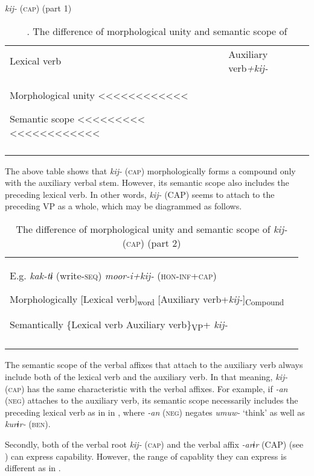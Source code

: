 \begin{table}
\caption{\label{tab:key:89}. The difference of morphological unity and semantic scope of} \textmd{\textit{kij-}}\textmd{ (\textsc{cap}) (part 1)}
\begin{tabular}{ll}
\lsptoprule
  Lexical verb  & Auxiliary verb\textit{+kij-}\\

Morphological unity    <<<<<<<<<<<<

Semantic scope  <<<<<<<<<  <<<<<<<<<<<<\\
\lspbottomrule
\end{tabular}
\end{table}

The above table shows that \textit{kij-} (\textsc{cap}) morphologically forms a compound only with the auxiliary verbal stem. However, its semantic scope also includes the preceding lexical verb. In other words, \textit{kij-} (CAP) seems to attach to the preceding VP as a whole, which may be diagrammed as follows.

\begin{table}
\caption{\label{tab:key:90} The difference of morphological unity and semantic scope of \textit{kij-} (\textsc{cap}) (part 2)}
\begin{tabular}{ll}
\lsptoprule
E.g.  \textit{kak-tɨ} (write-\textsc{seq})  \textit{moor-i+kij-} (\textsc{hon}-\textsc{inf}+\textsc{cap})

Morphologically  [Lexical verb]\textsubscript{word}  [Auxiliary verb+\textit{kij-}]\textsubscript{Compound}

Semantically  \{Lexical verb  Auxiliary verb\}\textsubscript{VP}+ \textit{kij-}\\
\lspbottomrule
\end{tabular}
\end{table}

The semantic scope of the verbal affixes that attach to the auxiliary verb always include both of the lexical verb and the auxiliary verb. In that meaning, \textit{kij-} (\textsc{cap}) has the same characteristic with the verbal affixes. For example, if \textit{-an} (\textsc{neg}) attaches to the auxiliary verb, its semantic scope necessarily includes the preceding lexical verb as in  in , where \textit{-an} (\textsc{neg}) negates \textit{umuw-} ‘think’ as well as \textit{kurɨr-} (\textsc{ben}).

  Secondly, both of the verbal root \textit{kij-} (\textsc{cap}) and the verbal affix \textit{-arɨr} (CAP) (see ) can express capability. However, the range of capablity they can express is different as in .

